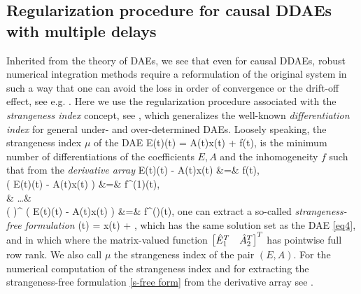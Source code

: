 \documentclass[final,reqno]{siamltex}
\begin{document}
\subsection{Regularization procedure for causal DDAEs with multiple delays}\label{Sec2.1}
Inherited from the theory of DAEs, we see that even for causal DDAEs, robust numerical integration methods require a reformulation of the original system in such a way that one can
avoid the loss in order of convergence or the drift-off effect, see e.g. \cite{BreCP96,KunM06}. Here we use the regularization procedure
associated with the \emph{strangeness index} concept, see \cite{KunM06}, which generalizes the well-known \emph{differentiation index} \cite{BreCP96} for general under- and over-determined DAEs. Loosely speaking, the strangeness index $\mu$ of the DAE
%
\be\label{eq4}
 E(t)(t) = A(t)x(t) + f(t),
\ee
%
is the minimum number of differentiations of the coefficients $E,A$ and the inhomogeneity $f$ such that from the \emph{derivative array} 
%
\bens
 E(t)(t) - A(t)x(t)  &=& f(t), \\
 \ddt \left( E(t)(t) - A(t)x(t) \right) &=& f^{(1)}(t), \\
 & \dots & \\
 \left( \ddt \right)^{\mu} \left( E(t)(t) - A(t)x(t) \right) &=& f^{(\mu)}(t),
\eens
%
one can extract a so-called \emph{strangeness-free formulation}
%
\be\label{s-free form}
  (t) =  x(t) + ,
\ee
%
which has the same solution set as the DAE \eqref{eq4}, and in which where the matrix-valued function $\begin{bmatrix} \hat{E}^T_1 & \hat{A}^T_2 \end{bmatrix}^T$ has pointwise full row rank. We also call $\mu$ the strangeness index of the pair $(E,A)$.
For the numerical computation of the strangeness index and for extracting the strangeness-free formulation \eqref{s-free form} from the derivative array see \cite{KunMRW97,KunMS05}.
\end{document}
